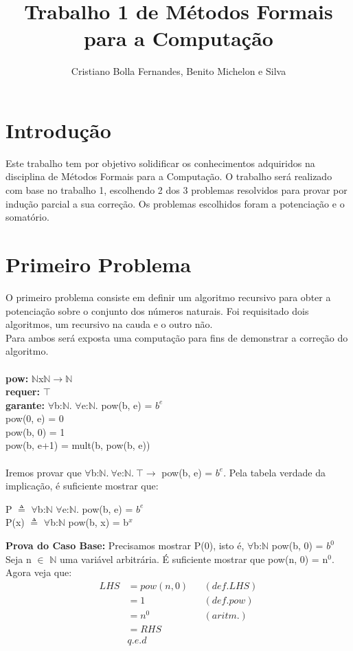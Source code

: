 \documentclass{article}
\title{Trabalho 1 de Métodos Formais para a Computação}
\author{Cristiano Bolla Fernandes, Benito Michelon e Silva}
\begin{document}
\maketitle

\section{Introdução}
Este trabalho tem por objetivo solidificar os conhecimentos adquiridos na disciplina de Métodos Formais para a Computação.
O trabalho será realizado com base no trabalho 1, escolhendo 2 dos 3 problemas resolvidos para provar por indução parcial a sua correção.
Os problemas escolhidos foram a potenciação e o somatório.

\section{Primeiro Problema}
O primeiro problema consiste em definir um algoritmo recursivo para obter a potenciação sobre o conjunto dos números naturais.
Foi requisitado dois algoritmos, um recursivo na cauda e o outro não.\\
Para ambos será exposta uma computação para fins de demonstrar a correção do algoritmo.\\
\\
\textbf{pow:} $\mathbb{N}$x$\mathbb{N}$$ \rightarrow \mathbb{N}$\\
\textbf{requer:} $\top$\\
\textbf{garante:} $\forall$b:$\mathbb{N}$. $\forall$e:$\mathbb{N}$. pow(b, e) = $b^e$\\
pow(0, e) = 0\\
pow(b, 0) = 1\\
pow(b, e+1) = mult(b, pow(b, e))\\
\\
Iremos provar que $\forall$b:$\mathbb{N}.\:\forall$e:$\mathbb{N}.\:\top\rightarrow$ pow(b, e) = $b^e$. Pela tabela verdade da implicação, é suficiente mostrar que:\\
\begin{center}
P $\triangleq$ $\forall$b:$\mathbb{N}$ $\forall$e:$\mathbb{N}$. pow(b, e) = $b^e$\\
P(x) $\triangleq$ $\forall$b:$\mathbb{N}$ pow(b, x) = b$^x$\\
\end{center}
\textbf{Prova do Caso Base:} Precisamos mostrar P(0), isto é, $\forall$b:$\mathbb{N}$ pow(b, 0) = $b^0$\\
Seja n $\in$ $\mathbb{N}$ uma variável arbitrária. É suficiente mostrar que pow(n, 0) = n$^0$.\\
Agora veja que:
\begin{align*}
LHS &= pow(n, 0) && (def. LHS)\\
&= 1 && (def. pow)\\
&= n^0 && (aritm.)\\
&= RHS\\
& q.e.d
\end{align*}
\end{document}
